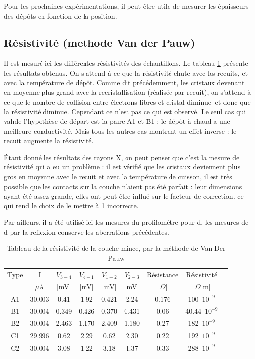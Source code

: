 \documentclass[a4paper,12pt,oneside]{article}
\begin{document}
Pour les prochaines expérimentations, il peut être utile de mesurer les épaisseurs des dépôts en fonction de la position.

\subsection{Résistivité (methode Van der Pauw)}

Il est mesuré ici les différentes résistivités des échantillons. Le tableau \ref{tab:vanderpauw} présente les résultats obtenus. On s'attend à ce que la résistivité chute avec les recuits, et avec la température de dépôt. Comme dit précédemment, les cristaux devenant en moyenne plus grand avec la recristallisation (réalisée par recuit), on s'attend à ce que le nombre de collision entre électrons libres et cristal diminue, et donc que la résistivité diminue. Cependant ce n'est pas ce qui est observé. Le seul cas qui valide l'hypothèse de départ est la paire A1 et B1 : le dépôt à chaud a une meilleure conductivité. Mais tous les autres cas montrent un effet inverse : le recuit augmente la résistivité.

Étant donné les résultats des rayons X, on peut penser que c'est la mesure de résistivité qui a eu un problème : il est vérifié que les cristaux deviennent plus gros en moyenne avec le recuit et avec la température de cuisson, il est très possible que les contacts sur la couche n'aient pas été parfait : leur dimensions ayant été assez grande, elles ont peut être influé sur le facteur de correction, ce qui rend le choix de le mettre à 1 incorrecte.

Par ailleurs, il a été utilisé ici les mesures du profilomètre pour d, les mesures de d par la reflexion conserve les aberrations précédentes.


\begin{table}[ht]
\centering
   \begin{tabular}{|c|c|c|c|c|c|c|c|c|}
	  \hline
      Type & I & $V_{3-4}$ & $V_{4-1}$ & $V_{1-2}$ & $V_{2-3}$ & Résistance& Résistivité\\
      &  [$\mu$A] & [mV] & [mV] & [mV] & [mV] & [$\Omega$] & [$\Omega$ m] \\
      \hline
      A1 & 30.003 & 0.41 & 1.92 & 0.421 & 2.24 & 0.176 & 100\ $10^{-9}$\\
      B1 & 30.004 & 0.349 & 0.426 & 0.370 & 0.431 & 0.06 & 40.44\ $10^{-9}$\\
      B2 & 30.004 & 2.463 & 1.170 & 2.409 & 1.180 & 0.27 & 182\ $10^{-9}$\\
      C1 & 29.996 & 0.62 & 2.29 & 0.62 & 2.30 & 0.22 & 192\ $10^{-9}$\\
      C2 & 30.004 & 3.08 & 1.22 & 3.18 & 1.37 & 0.33 & 288\ $10^{-9}$\\
      \hline
   \end{tabular}
   \caption{Tableau de la résistivité de la couche mince, par la méthode de Van Der Pauw}\label{tab:vanderpauw}
\end{table}
\end{document}
